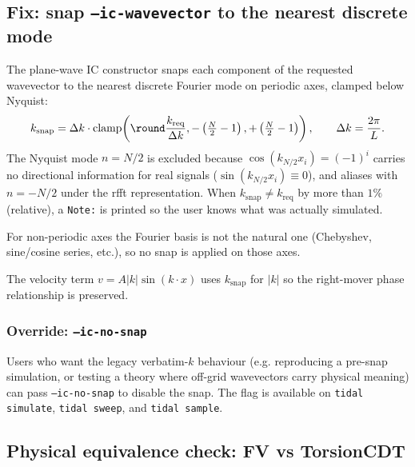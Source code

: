 \subsection{Fix: snap \texttt{--ic-wavevector} to the nearest discrete mode}
\label{sec:pw-snap}

The plane-wave IC constructor snaps each component of the requested
wavevector to the nearest discrete Fourier mode on periodic axes,
clamped below Nyquist:
\begin{equation}
  k_{\mathrm{snap}} = \Delta k \cdot
    \mathrm{clamp}\!\left(\round\frac{k_{\mathrm{req}}}{\Delta k},
                          -\left(\tfrac{N}{2}-1\right),
                          +\left(\tfrac{N}{2}-1\right)\right),
  \qquad \Delta k = \frac{2\pi}{L}.
  \label{eq:snap-formula}
\end{equation}
The Nyquist mode $n = N/2$ is excluded because $\cos(k_{N/2} x_i) = (-1)^i$
carries no directional information for real signals
($\sin(k_{N/2} x_i) \equiv 0$), and aliases with $n = -N/2$ under the
rfft representation. When
$k_{\mathrm{snap}} \neq k_{\mathrm{req}}$ by more than $1\%$ (relative), a
\texttt{Note:} is printed so the user knows what was actually simulated.

For non-periodic axes the Fourier basis is not the natural one
(Chebyshev, sine/cosine series, etc.), so no snap is applied on those
axes.

The velocity term $v = A |k| \sin(k \cdot x)$ uses $k_{\mathrm{snap}}$
for $|k|$ so the right-mover phase relationship is preserved.

\subsubsection{Override: \texttt{--ic-no-snap}}

Users who want the legacy verbatim-$k$ behaviour (e.g. reproducing a
pre-snap simulation, or testing a theory where off-grid wavevectors
carry physical meaning) can pass \texttt{--ic-no-snap} to disable the
snap. The flag is available on \texttt{tidal simulate},
\texttt{tidal sweep}, and \texttt{tidal sample}.

\subsection{Physical equivalence check: FV vs TorsionCDT}
\label{sec:pw-fv-vs-cdt}

